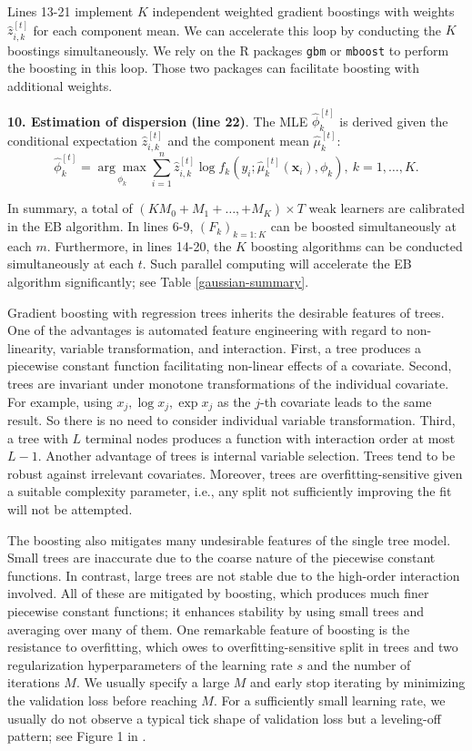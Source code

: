 \documentclass[11pt]{article}
\numberwithin{equation}{section}
\def\bx{\boldsymbol{x}}
\begin{document}
Lines 13-21 implement $K$ independent weighted gradient boostings with weights $\hat{z}_{i,k}^{[t]}$ for each component mean.
We can accelerate this loop  by conducting the $K$ boostings simultaneously.
We rely on the R packages {\tt gbm} or {\tt mboost} to perform the boosting in this loop. 
Those two packages can facilitate boosting with additional weights.


{\bf 10. Estimation of dispersion (line 22)}. 
The MLE $\hat{\phi}_k^{[t]}$ is derived given the conditional expectation $\hat{z}_{i,k}^{[t]}$ and the component mean $\hat{\mu}_k^{[t]}$:
\begin{equation}
		\hat{\phi}_k^{[t]}=\underset{\phi_k}{\arg\max} \sum_{i=1}^n\hat{z}_{i,k}^{[t]}\log f_k(y_i;\hat{\mu}_k^{[t]}(\bx_i),\phi_k), ~ k=1,\ldots,K.
\end{equation}

In summary, a total of $(KM_0+M_1+\ldots,+M_K)\times T$ weak learners are calibrated in the EB algorithm. 
In lines 6-9, $(F_k)_{k=1:K}$ can be boosted simultaneously at each $m$.
Furthermore, in lines 14-20, the $K$ boosting algorithms can be conducted simultaneously at each $t$. 
Such parallel computing will accelerate the EB algorithm significantly; see Table \ref{gaussian-summary}.

Gradient boosting with regression trees inherits the desirable features of trees.
One of the advantages is automated feature engineering with regard to non-linearity, variable transformation, and interaction. 
First, a tree produces a piecewise constant function facilitating non-linear effects of a covariate.
Second, trees are invariant under monotone transformations of the individual covariate. 
For example, using $x_j,\log x_j, \exp x_j$ as the $j$-th covariate leads to the same result.
So there is no need to consider individual variable transformation.
Third, a tree with $L$ terminal nodes produces a function with interaction order at most $L-1$.
Another advantage of trees is internal variable selection. Trees tend to be robust against irrelevant covariates.
Moreover, trees are overfitting-sensitive given a suitable complexity parameter, i.e., any split not sufficiently improving the fit will not be attempted. 

The boosting also mitigates many undesirable features of the single tree model. 
Small trees are inaccurate due to the coarse nature of the piecewise constant functions. In contrast, large trees are not stable due to the high-order interaction involved.
All of these are mitigated by boosting, which produces much finer piecewise constant functions; it enhances stability by using small trees and averaging over many of them.
One remarkable feature of boosting is the resistance to overfitting, which owes to overfitting-sensitive split in trees and two regularization hyperparameters of the learning rate $s$ and the number of iterations $M$.
We usually specify a large $M$ and early stop iterating by minimizing the validation loss before reaching $M$.
For a sufficiently small learning rate, we usually do not observe a typical tick shape of validation loss but a leveling-off pattern; see Figure 1 in \cite{friedman2001greedy}.
\end{document}
